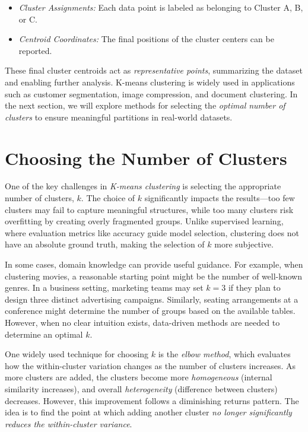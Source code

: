 \documentclass[
]{book}
\providecommand{\tightlist}{%
  \setlength{\itemsep}{0pt}\setlength{\parskip}{0pt}}
\theoremstyle{definition}
\theoremstyle{definition}
\theoremstyle{definition}
\theoremstyle{definition}
\theoremstyle{remark}
\begin{document}
\begin{itemize}
\tightlist
\item
  \emph{Cluster Assignments:} Each data point is labeled as belonging to Cluster A, B, or C.\\
\item
  \emph{Centroid Coordinates:} The final positions of the cluster centers can be reported.
\end{itemize}

These final cluster centroids act as \emph{representative points}, summarizing the dataset and enabling further analysis. K-means clustering is widely used in applications such as customer segmentation, image compression, and document clustering. In the next section, we will explore methods for selecting the \emph{optimal number of clusters} to ensure meaningful partitions in real-world datasets.

\section{Choosing the Number of Clusters}\label{kmeans-choose}

One of the key challenges in \emph{K-means clustering} is selecting the appropriate number of clusters, \emph{\(k\)}. The choice of \(k\) significantly impacts the results---too few clusters may fail to capture meaningful structures, while too many clusters risk overfitting by creating overly fragmented groups. Unlike supervised learning, where evaluation metrics like accuracy guide model selection, clustering does not have an absolute ground truth, making the selection of \(k\) more subjective.

In some cases, domain knowledge can provide useful guidance. For example, when clustering movies, a reasonable starting point might be the number of well-known genres. In a business setting, marketing teams may set \(k = 3\) if they plan to design three distinct advertising campaigns. Similarly, seating arrangements at a conference might determine the number of groups based on the available tables. However, when no clear intuition exists, data-driven methods are needed to determine an optimal \(k\).

One widely used technique for choosing \(k\) is the \emph{elbow method}, which evaluates how the within-cluster variation changes as the number of clusters increases. As more clusters are added, the clusters become more \emph{homogeneous} (internal similarity increases), and overall \emph{heterogeneity} (difference between clusters) decreases. However, this improvement follows a diminishing returns pattern. The idea is to find the point at which adding another cluster \emph{no longer significantly reduces the within-cluster variance}.
\end{document}
